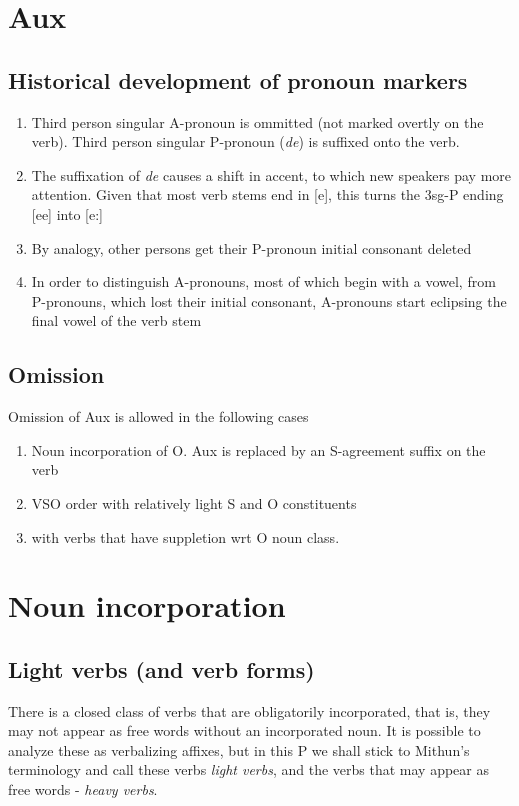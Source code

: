 \documentclass[8pt]{book}
\begin{document}
\section{Aux}

\subsection{Historical development of pronoun markers}
\begin{enumerate}
	\item Third person singular A-pronoun is ommitted (not marked overtly on the verb). Third person singular P-pronoun (\textit{de}) is suffixed onto the verb.
	\item The suffixation of \textit{de} causes a shift in accent, to which new speakers pay more attention. Given that most verb stems end in [e], this turns the 3sg-P ending [ee] into [e:]
	\item By analogy, other persons get their P-pronoun initial consonant deleted
	\item In order to distinguish A-pronouns, most of which begin with a vowel, from P-pronouns, which lost their initial consonant, A-pronouns start eclipsing the final vowel of the verb stem
\end{enumerate}

\subsection{Omission}
Omission of Aux is allowed in the following cases
\begin{enumerate}
	\item Noun incorporation of O. Aux is replaced by an S-agreement suffix on the verb
	\item VSO order with relatively light S and O constituents
	\item with verbs that have suppletion wrt O noun class.
\end{enumerate}


\section{Noun incorporation}



\subsection{Light verbs (and verb forms)}
There is a closed class of verbs that are obligatorily incorporated, that is, they may not appear as free words without an incorporated noun. It is possible to analyze these as verbalizing affixes, but in this P we shall stick to Mithun's terminology and call these verbs \textit{light verbs}, and the verbs that may appear as free words - \textit{heavy verbs}.\\
\end{document}
